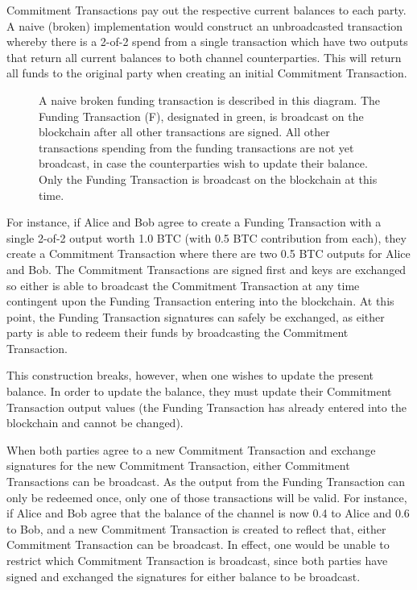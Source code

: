 \documentclass[letterpaper,11pt]{article}
\begin{document}
Commitment Transactions pay out the respective current balances to each party.
A naive (broken) implementation would construct an unbroadcasted transaction
whereby there is a 2-of-2 spend from a single transaction which have two
outputs that return all current balances to both channel counterparties. This
will return all funds to the original party when creating an initial Commitment
Transaction.

\begin{figure}[H]
	\caption{A naive broken funding transaction is described in this
		diagram. The Funding Transaction (F), designated in green, is
		broadcast on the blockchain after all other transactions are
		signed. All other transactions spending from the funding
		transactions are not yet broadcast, in case the counterparties
		wish to update their balance. Only the Funding Transaction is
		broadcast on the blockchain at this time.
	}
\end{figure}

For instance, if Alice and Bob agree to create a Funding Transaction with a
single 2-of-2 output worth 1.0 BTC (with 0.5 BTC contribution from each), they
create a Commitment Transaction where there are two 0.5 BTC outputs for Alice
and Bob. The Commitment Transactions are signed first and keys are exchanged so
either is able to broadcast the Commitment Transaction at any time contingent
upon the Funding Transaction entering into the blockchain. At this point, the
Funding Transaction signatures can safely be exchanged, as either party is able
to redeem their funds by broadcasting the Commitment Transaction.

This construction breaks, however, when one wishes to update the present
balance. In order to update the balance, they must update their Commitment
Transaction output values (the Funding Transaction has already entered into the
blockchain and cannot be changed).

When both parties agree to a new Commitment Transaction and exchange signatures
for the new Commitment Transaction, either Commitment Transactions can be
broadcast. As the output from the Funding Transaction can only be redeemed once,
only one of those transactions will be valid. For instance, if Alice and Bob
agree that the balance of the channel is now 0.4 to Alice and 0.6 to Bob, and
a new Commitment Transaction is created to reflect that, either Commitment
Transaction can be broadcast. In effect, one would be unable to restrict which
Commitment Transaction is broadcast, since both parties have signed and
exchanged the signatures for either balance to be broadcast.
\end{document}
